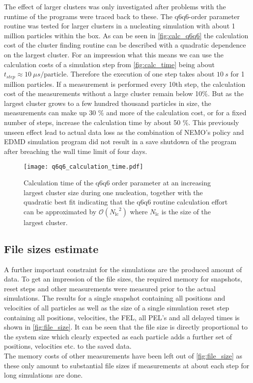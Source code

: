 The effect of larger clusters was only investigated after problems with the runtime of the programs were traced back to these. The q6q6-order parameter routine was tested for larger clusters in a nucleating simulation with about 1 million particles within the box. As can be seen in \autoref{fig:calc_q6q6} the calculation cost of the cluster finding routine can be described with a quadratic dependence on the largest cluster. For an impression what this means we can use the calculation costs of a simulation step from \autoref{fig:calc_time} being about $t_{step} \approx \SI{10}{\mu s \per \text{particle} }$. Therefore the execution of one step takes about $\SI{10}{s}$ for 1 million particles. If a measurement is performed every 10th step, the calculation cost of the measurements without a large cluster remain below 10\%. But as the largest cluster grows to a few hundred thousand particles in size, the measurements can make up 30 \% and more of the calculation cost, or for a fixed number of steps, increase the calculation time by about 50 \%. This previously unseen effect lead to actual data loss as the combination of NEMO's policy and EDMD simulation program did not result in a save shutdown of the program after breaching the wall time limit of four days.\\

\begin{figure}[h!]
\centering
\texttt{[image: q6q6\_calculation\_time.pdf]}
\caption[Quadratic calculation time of q6q6-order parameter cluster finding routine]{Calculation time of the q6q6 order parameter at an increasing largest cluster size during one nucleation, together with the quadratic best fit indicating that the q6q6 routine calculation effort can be approximated by $\mathcal{O}({N_{\text{lc}}}^2)$ where $N_{\text{lc}}$ is the size of the largest cluster.}
\label{fig:calc_q6q6}
\end{figure}


\subsection{File sizes estimate}
\label{sec:file_size}
A further important constraint for the simulations are the produced amount of data. To get an impression of the file sizes, the required memory for snapshots, reset steps and other measurements were measured prior to the actual simulations. The results for a single snapshot containing all positions and velocities of all particles as well as the size of a single simulation reset step containing all positions, velocities, the FEL, all PEL's and all delayed times is shown in \autoref{fig:file_size}. It can be seen that the file size is directly proportional to the system size which clearly expected as each particle adds a further set of positions, velocities etc. to the saved data.\\
The memory costs of other measurements have been left out of \autoref{fig:file_size} as these only amount to substantial file sizes if measurements at about each step for long simulations are done.\\  

